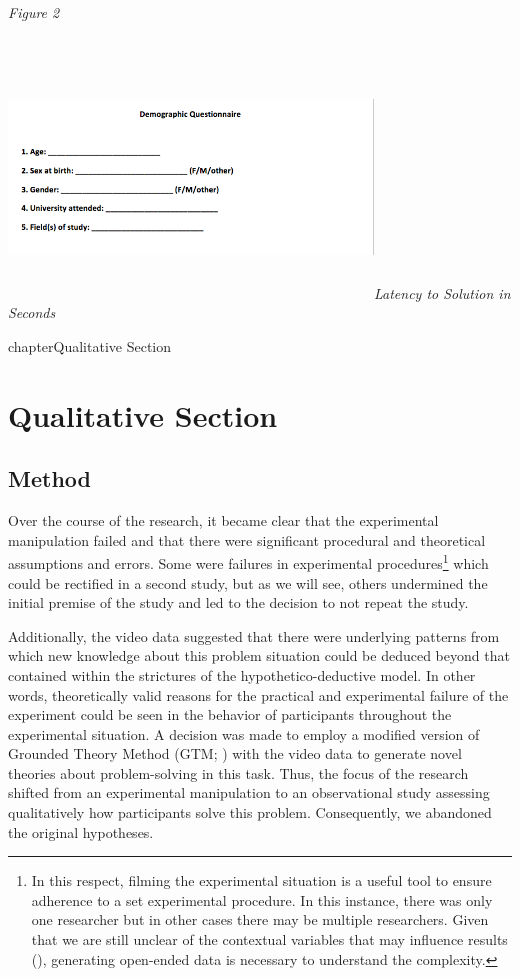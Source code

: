 {{
\subparagraph{}


\subparagraph{Figure 2}

\includegraphics[width=3.8125in,height=2.54097in]{media/image2.png}\emph{Latency to Solution in Seconds} 

chapter{Qualitative Section}
\chapter{Qualitative Section}


\section{Method}

Over the course of the research, it became clear that the experimental manipulation failed and that there were significant procedural and theoretical assumptions and errors. Some were failures in experimental procedures\footnote{ In this respect, filming the experimental situation is a useful tool to ensure adherence to a set experimental procedure.
 In this instance, there was only one researcher but in other cases there may be multiple researchers. Given that we are still unclear of the contextual variables that may influence results (), generating open-ended data is necessary to understand the complexity.} which could be rectified in a second study, but as we will see, others undermined the initial premise of the study and led to the decision to not repeat the study.

Additionally, the video data suggested that there were underlying patterns from which new knowledge about this problem situation could be deduced beyond that contained within the strictures of the hypothetico-deductive model. In other words, theoretically valid reasons for the practical and experimental failure of the experiment could be seen in the behavior of participants throughout the experimental situation. A decision was made to employ a modified version of Grounded Theory Method (GTM; ) with the video data to generate novel theories about problem-solving in this task. Thus, the focus of the research shifted from an experimental manipulation to an observational study assessing qualitatively how participants solve this problem. Consequently, we abandoned the original hypotheses.


}}
